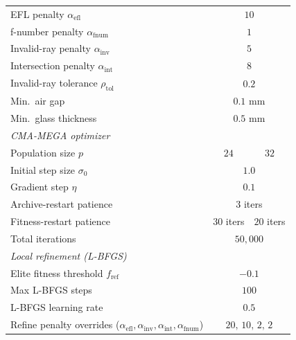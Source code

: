 \begin{table}[h]
\begin{tabular}{lcc}
EFL penalty $\alpha_{\mathrm{efl}}$          & \multicolumn{2}{c}{$10$} \\
f-number penalty $\alpha_{\mathrm{fnum}}$    & \multicolumn{2}{c}{$1$} \\
Invalid-ray penalty $\alpha_{\mathrm{inv}}$  & \multicolumn{2}{c}{$5$} \\
Intersection penalty $\alpha_{\mathrm{int}}$ & \multicolumn{2}{c}{$8$} \\
Invalid-ray tolerance $\rho_{\mathrm{tol}}$  & \multicolumn{2}{c}{$0.2$} \\
Min.\ air gap                        & \multicolumn{2}{c}{$0.1$ mm} \\
Min.\ glass thickness                & \multicolumn{2}{c}{$0.5$ mm} \\
\midrule
\multicolumn{3}{l}{\emph{CMA-MEGA optimizer}} \\
Population size $p$                   & $24$ & $32$ \\
Initial step size $\sigma_0$         & \multicolumn{2}{c}{$1.0$} \\
Gradient step $\eta$                 & \multicolumn{2}{c}{$0.1$} \\
Archive-restart patience             & \multicolumn{2}{c}{$3$ iters} \\
Fitness-restart patience             & $30$ iters & $20$ iters \\
Total iterations                     & \multicolumn{2}{c}{$50{,}000$} \\
\midrule
\multicolumn{3}{l}{\emph{Local refinement (L-BFGS)}} \\
Elite fitness threshold $f_{\mathrm{ref}}$ & \multicolumn{2}{c}{$-0.1$} \\
Max L-BFGS steps                     & \multicolumn{2}{c}{$100$} \\
L-BFGS learning rate                 & \multicolumn{2}{c}{$0.5$} \\
Refine penalty overrides
  ($\alpha_{\mathrm{efl}},\alpha_{\mathrm{inv}},\alpha_{\mathrm{int}},\alpha_{\mathrm{fnum}}$)
                                     & \multicolumn{2}{c}{$20,\,10,\,2,\,2$} \\
\bottomrule
\end{tabular}
\end{table}
